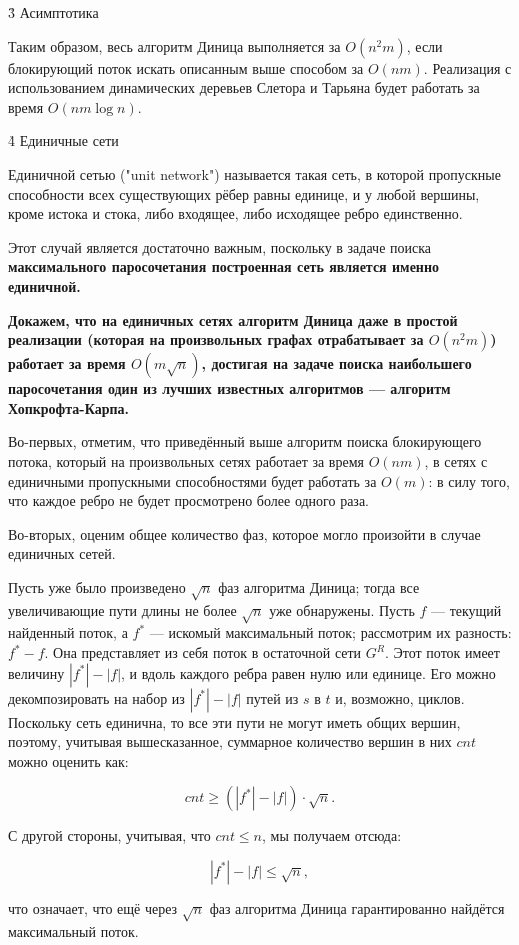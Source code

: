 \h3{ Асимптотика }

Таким образом, весь алгоритм Диница выполняется за $O (n^2 m)$, если блокирующий поток искать описанным выше способом за $O (n m)$. Реализация с использованием динамических деревьев Слетора и Тарьяна будет работать за время $O (n m \log n)$.

\h4{ Единичные сети }

Единичной сетью ("unit network") называется такая сеть, в которой пропускные способности всех существующих рёбер равны единице, и у любой вершины, кроме истока и стока, либо входящее, либо исходящее ребро единственно.

Этот случай является достаточно важным, поскольку в задаче поиска \bf{максимального паросочетания} построенная сеть является именно единичной.

\bf{Докажем}, что на единичных сетях алгоритм Диница даже в простой реализации (которая на произвольных графах отрабатывает за $O (n^2 m)$) работает за время $O (m \sqrt{n})$, достигая на задаче поиска наибольшего паросочетания один из лучших известных алгоритмов --- алгоритм Хопкрофта-Карпа.

Во-первых, отметим, что приведённый выше алгоритм поиска блокирующего потока, который на произвольных сетях работает за время $O (n m)$, в сетях с единичными пропускными способностями будет работать за $O (m)$: в силу того, что каждое ребро не будет просмотрено более одного раза.

Во-вторых, оценим общее количество фаз, которое могло произойти в случае единичных сетей.

Пусть уже было произведено $\sqrt{n}$ фаз алгоритма Диница; тогда все увеличивающие пути длины не более $\sqrt{n}$ уже обнаружены. Пусть $f$ --- текущий найденный поток, а $f^*$ --- искомый максимальный поток; рассмотрим их разность: $f^* - f$. Она представляет из себя поток в остаточной сети $G^R$. Этот поток имеет величину $|f^*| - |f|$, и вдоль каждого ребра равен нулю или единице. Его можно декомпозировать на набор из $|f^*| - |f|$ путей из $s$ в $t$ и, возможно, циклов. Поскольку сеть единична, то все эти пути не могут иметь общих вершин, поэтому, учитывая вышесказанное, суммарное количество вершин в них $cnt$ можно оценить как:

$$ cnt \ge (|f^*| - |f|) \cdot \sqrt{n}. $$

С другой стороны, учитывая, что $cnt \le n$, мы получаем отсюда:

$$ |f^*| - |f| \le \sqrt{n}, $$

что означает, что ещё через $\sqrt{n}$ фаз алгоритма Диница гарантированно найдётся максимальный поток.

